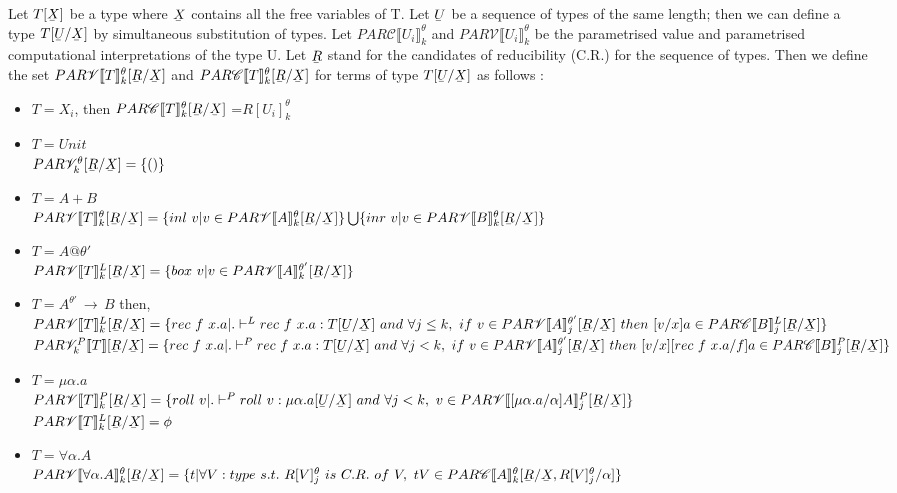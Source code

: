 \documentclass[12pt]{article}
\author{Ankit Kumar}
\newcommand{\ub}[1]{\underaccent{\bar}{#1}}
\newcommand{\arr}{\ensuremath{\,\rightarrow\,}}
\newcommand{\llrr}[1]{\llbracket {#1} \rrbracket}
\begin{document}
Let $T[\ub{X}]$ be a type where $\ub{X}$ contains all the free
variables of T. Let $\ub{U}$ be a sequence of types of the same
length; then we can define a type $T[\ub{U}/\ub{X}]$ by simultaneous
substitution of types. Let $PAR\mathscr{C}\llrr{U_i}^\theta_k$ and $PAR\mathscr{V}\llrr{U_i}^\theta_k$ be
the parametrised value and parametrised  computational interpretations of the type
U. Let $\ub{R}$ stand for the candidates of reducibility (C.R.) for
the sequence of types. Then we define the set
$PAR\mathscr{V}\llrr{T}^\theta_k[\ub{R}/\ub{X}]$ and
$PAR\mathscr{C}\llrr{T}^\theta_k[\ub{R}/\ub{X}]$ for terms of type
$T[\ub{U}/\ub{X}]$ as follows :
\begin{itemize}
\item $T = X_i$, then $PAR\mathscr{C}\llrr{T}^\theta_k[\ub{R}/\ub{X}]$ =$R[U_i]^\theta_k$
\item $T = Unit$\\
$PAR\mathscr{V}^{\theta}_k[\ub{R}/\ub{X}]  = \{()\}$
\item $T = A+B$\\
$PAR\mathscr{V}\llrr{T}^{\theta}_k[\ub{R}/\ub{X}] = \{inl\ v | v \in
PAR\mathscr{V}\llrr{A}^{\theta}_k[\ub{R}/\ub{X}]\}  \bigcup \{inr\ v | v \in
PAR\mathscr{V}\llrr{B}^{\theta}_k[\ub{R}/\ub{X}]\} $
\item $T = A@\theta'$\\
$PAR\mathscr{V}\llrr{T}^L_k[\ub{R}/\ub{X}] = \{box\ v | v \in PAR\mathscr{V}\llrr{A}^{\theta'}_k[\ub{R}/\ub{X}]\}$

\item $T = A^{\theta'} \arr B $ then,\\
$
PAR\mathscr{V}\llrr{T}^L_k[\ub{R}/\ub{X}] = \{rec\ f\ x.a | . \vdash^L rec\ f\
  x.a : T[\ub{U}/\ub{X}]\ and\ \forall j \leq k,\ if\ v \in
  PAR\mathscr{V}\llrr{A}^{\theta'}_j[\ub{R}/\ub{X}]\ then\ [v/x]a \in  PAR\mathscr{C}\llrr{B}^L_j[\ub{R}/\ub{X}]\}
$\\
$
PAR\mathscr{V}^P_k\llrr{T}[\ub{R}/\ub{X}] = \{rec\ f\ x.a | . \vdash^P rec\ f\
  x.a : T[\ub{U}/\ub{X}]\ and\ \forall j < k,\ if\ v \in
  PAR\mathscr{V}\llrr{A}^{\theta'}_j[\ub{R}/\ub{X}]\ then\ [v/x][rec\
  f\ x.a/f]a \in  PAR\mathscr{C}\llrr{B}^P_j[\ub{R}/\ub{X}]\}
$
\item $T = \mu\alpha.a$\\
$
 PAR\mathscr{V}\llrr{T}^P_k[\ub{R}/\ub{X}] = \{roll\ v | . \vdash^P
 roll\ v: \mu\alpha.a[\ub{U}/\ub{X}]\ and\ \forall j < k,\ v \in
  PAR\mathscr{V}\llrr{[\mu\alpha.a/\alpha]A}^P_j[\ub{R}/\ub{X}]\}
$\\
 $PAR\mathscr{V}\llrr{T}^L_k[\ub{R}/\ub{X}] = \phi$ 
\item $T = \forall\alpha.A$\\
$
PAR\mathscr{V}\llrr{\forall \alpha.A}^{\theta}_k[\ub{R}/\ub{X}] = \{ t |
\forall V:type\ s.t.\ R[V]^\theta_j\ is\ C.R.\ of\ V,\ tV \in PAR\mathscr{C}\llrr{A}^{\theta}_k[\ub{R}/\ub{X},R[V]^\theta_j/\alpha]\}
$

\end{itemize}
\end{document}
